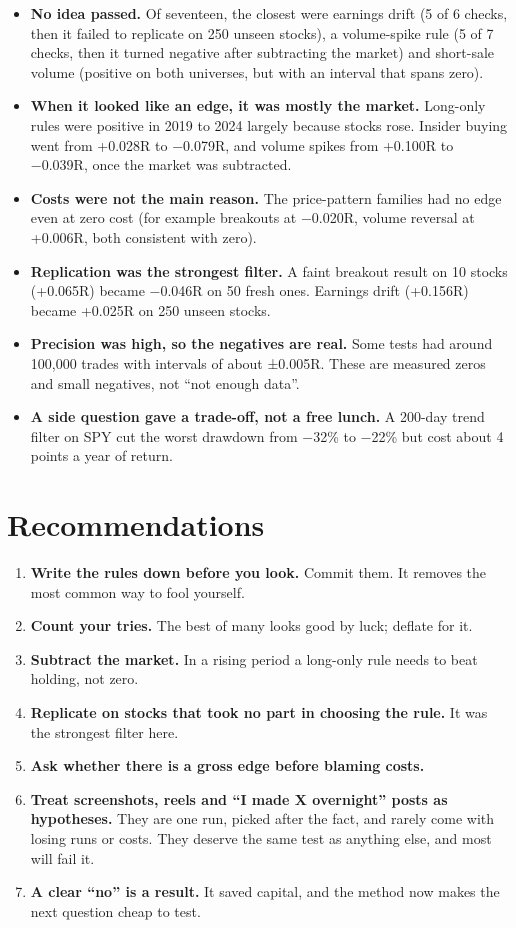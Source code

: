 \documentclass[11pt,a4paper]{article}
\providecommand{\tightlist}{\setlength{\itemsep}{0pt}\setlength{\parskip}{0pt}}
\begin{document}
\begin{itemize}
\tightlist
\item
  \textbf{No idea passed.} Of seventeen, the closest were earnings drift (5 of 6 checks, then it failed to replicate on 250
  unseen stocks), a volume-spike rule (5 of 7 checks, then it turned negative after subtracting the market) and short-sale
  volume (positive on both universes, but with an interval that spans zero).
\item
  \textbf{When it looked like an edge, it was mostly the market.} Long-only rules were positive in 2019 to 2024 largely
  because stocks rose. Insider buying went from +0.028R to −0.079R, and volume spikes from +0.100R to −0.039R, once the
  market was subtracted.
\item
  \textbf{Costs were not the main reason.} The price-pattern families had no edge even at zero cost (for example breakouts at
  −0.020R, volume reversal at +0.006R, both consistent with zero).
\item
  \textbf{Replication was the strongest filter.} A faint breakout result on 10 stocks (+0.065R) became −0.046R on 50 fresh
  ones. Earnings drift (+0.156R) became +0.025R on 250 unseen stocks.
\item
  \textbf{Precision was high, so the negatives are real.} Some tests had around 100,000 trades with intervals of about
  ±0.005R. These are measured zeros and small negatives, not ``not enough data''.
\item
  \textbf{A side question gave a trade-off, not a free lunch.} A 200-day trend filter on SPY cut the worst drawdown from −32\% to
  −22\% but cost about 4 points a year of return.
\end{itemize}

\section{Recommendations}\label{sec:recommendations}

\begin{enumerate}
\def\labelenumi{\arabic{enumi}.}
\tightlist
\item
  \textbf{Write the rules down before you look.} Commit them. It removes the most common way to fool yourself.
\item
  \textbf{Count your tries.} The best of many looks good by luck; deflate for it.
\item
  \textbf{Subtract the market.} In a rising period a long-only rule needs to beat holding, not zero.
\item
  \textbf{Replicate on stocks that took no part in choosing the rule.} It was the strongest filter here.
\item
  \textbf{Ask whether there is a gross edge before blaming costs.}
\item
  \textbf{Treat screenshots, reels and ``I made X overnight'' posts as hypotheses.} They are one run, picked after the fact, and
  rarely come with losing runs or costs. They deserve the same test as anything else, and most will fail it.
\item
  \textbf{A clear ``no'' is a result.} It saved capital, and the method now makes the next question cheap to test.
\end{enumerate}
\end{document}
